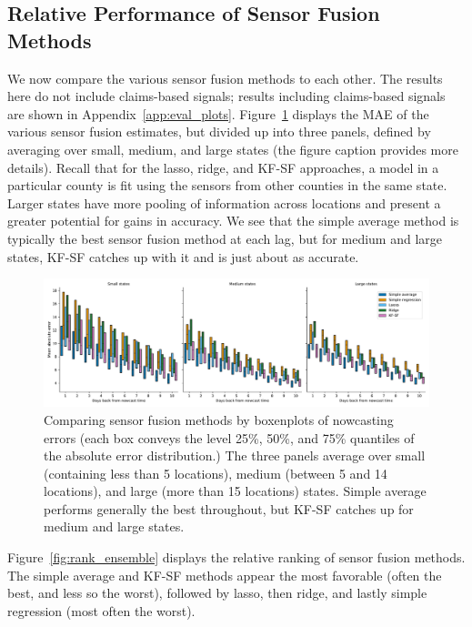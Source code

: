 \documentclass[sts]{imsart}
\theoremstyle{plain}
\theoremstyle{definition}
\theoremstyle{remark}
\begin{document}
\subsection{Relative Performance of Sensor Fusion Methods}
 
We now compare the various sensor fusion methods to each other. The results here
do not include claims-based signals; results including claims-based signals are
shown in Appendix~\ref{app:eval_plots}. Figure~\ref{fig:mae_sml} displays the
MAE of the various sensor fusion estimates, but divided up into three panels,
defined by averaging over small, medium, and large states (the figure caption
provides more details). Recall that for the lasso, ridge, and KF-SF approaches,
a model in a particular county is fit using the sensors from other counties in
the same state. Larger states have more pooling of information across locations
and present a greater potential for gains in accuracy. We see that the simple
average method is typically the best sensor fusion method at each lag, but for
medium and large states, KF-SF catches up with it and is just about as accurate.

\begin{figure}[tb]
\centering
\includegraphics[width=0.95\linewidth]{./figures/boxenplot_no_claims.pdf}
\caption{Comparing sensor fusion methods by boxenplots of nowcasting
  errors (each box conveys the level 25\%, 50\%, and 75\% quantiles of the  
  absolute error distribution.) The three panels average over small (containing
  less than 5 locations), medium (between 5 and 14 locations), and large (more
  than 15 locations) states. Simple average performs generally the best
  throughout, but KF-SF catches up for medium and large states.}  
	\label{fig:mae_sml}
\end{figure}

Figure~\ref{fig:rank_ensemble} displays the relative ranking of sensor fusion
methods. The simple average and KF-SF methods appear the most favorable
(often the best, and less so the worst), followed by lasso, then ridge, and 
lastly simple regression (most often the worst).   
\end{document}
